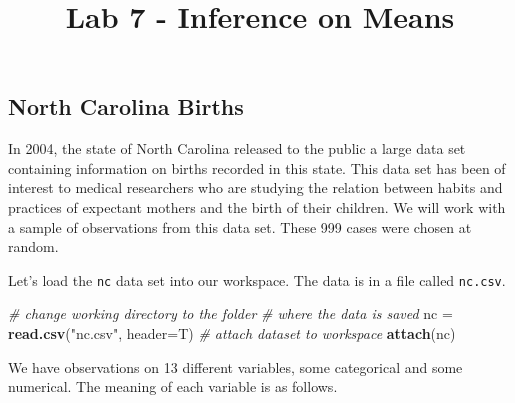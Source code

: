 \documentclass[
]{article}
\title{Lab 7 - Inference on Means}
\author{}
\date{\vspace{-2.5em}}
\newenvironment{Shaded}{\begin{snugshade}}{\end{snugshade}}
\newcommand{\AttributeTok}[1]{\textcolor[rgb]{0.13,0.29,0.53}{#1}}
\newcommand{\CommentTok}[1]{\textcolor[rgb]{0.56,0.35,0.01}{\textit{#1}}}
\newcommand{\FunctionTok}[1]{\textcolor[rgb]{0.13,0.29,0.53}{\textbf{#1}}}
\newcommand{\NormalTok}[1]{#1}
\newcommand{\OtherTok}[1]{\textcolor[rgb]{0.56,0.35,0.01}{#1}}
\newcommand{\StringTok}[1]{\textcolor[rgb]{0.31,0.60,0.02}{#1}}
\begin{document}
\maketitle

\subsection{North Carolina Births}\label{north-carolina-births}

In 2004, the state of North Carolina released to the public a large data
set containing information on births recorded in this state. This data
set has been of interest to medical researchers who are studying the
relation between habits and practices of expectant mothers and the birth
of their children. We will work with a sample of observations from this
data set. These 999 cases were chosen at random.

Let's load the \texttt{nc} data set into our workspace. The data is in a
file called \texttt{nc.csv}.

\vspace{3mm}

\begin{Shaded}
\begin{Highlighting}[]
\CommentTok{\# change working directory to the folder}
\CommentTok{\# where the data is saved}
\NormalTok{nc }\OtherTok{=} \FunctionTok{read.csv}\NormalTok{(}\StringTok{"nc.csv"}\NormalTok{, }\AttributeTok{header=}\NormalTok{T)}
\CommentTok{\# attach dataset to workspace}
\FunctionTok{attach}\NormalTok{(nc)}
\end{Highlighting}
\end{Shaded}

We have observations on 13 different variables, some categorical and
some numerical. The meaning of each variable is as follows.
\end{document}
